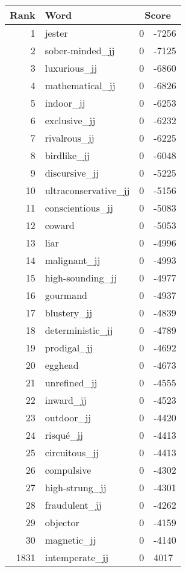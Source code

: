 \begin{longtable}[!htbp]{| rlr@{.}l |}
    \hline
    \textbf{Rank} & \textbf{Word} & \multicolumn{2}{c|}{\textbf{Score}} \\
    \hline
    \endhead
    1 & jester & 0 & -7256 \\
    2 & sober-minded\_jj & 0 & -7125 \\
    3 & luxurious\_jj & 0 & -6860 \\
    4 & mathematical\_jj & 0 & -6826 \\
    5 & indoor\_jj & 0 & -6253 \\
    6 & exclusive\_jj & 0 & -6232 \\
    7 & rivalrous\_jj & 0 & -6225 \\
    8 & birdlike\_jj & 0 & -6048 \\
    9 & discursive\_jj & 0 & -5225 \\
    10 & ultraconservative\_jj & 0 & -5156 \\
    11 & conscientious\_jj & 0 & -5083 \\
    12 & coward & 0 & -5053 \\
    13 & liar & 0 & -4996 \\
    14 & malignant\_jj & 0 & -4993 \\
    15 & high-sounding\_jj & 0 & -4977 \\
    16 & gourmand & 0 & -4937 \\
    17 & blustery\_jj & 0 & -4839 \\
    18 & deterministic\_jj & 0 & -4789 \\
    19 & prodigal\_jj & 0 & -4692 \\
    20 & egghead & 0 & -4673 \\
    21 & unrefined\_jj & 0 & -4555 \\
    22 & inward\_jj & 0 & -4523 \\
    23 & outdoor\_jj & 0 & -4420 \\
    24 & risqué\_jj & 0 & -4413 \\
    25 & circuitous\_jj & 0 & -4413 \\
    26 & compulsive & 0 & -4302 \\
    27 & high-strung\_jj & 0 & -4301 \\
    28 & fraudulent\_jj & 0 & -4262 \\
    29 & objector & 0 & -4159 \\
    30 & magnetic\_jj & 0 & -4140 \\
    1831 & intemperate\_jj & 0 & 4017 \\

\end{longtable}
